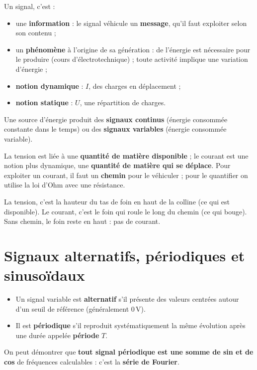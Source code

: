 \begin{defnbox}[title=Signal]
Un signal, c'est :
\begin{itemize}
  \item une \textbf{information} : le signal véhicule un \textbf{message}, qu'il faut
        exploiter selon son contenu ;
  \item un \textbf{phénomène} à l'origine de sa génération : de l'énergie est nécessaire pour
        le produire (cours d'électrotechnique) ; toute activité implique une variation
        d'énergie ;
  \item \textbf{notion dynamique} : $I$, des charges en déplacement ;
  \item \textbf{notion statique} : $U$, une répartition de charges.
\end{itemize}
Une source d'énergie produit des \textbf{signaux continus} (énergie consommée constante dans
le temps) ou des \textbf{signaux variables} (énergie consommée variable).
\end{defnbox}

La tension est liée à une \textbf{quantité de matière disponible} ; le courant est une notion
plus dynamique, une \textbf{quantité de matière qui se déplace}. Pour exploiter un courant, il
faut un \textbf{chemin} pour le véhiculer ; pour le quantifier on utilise la loi d'Ohm avec une
résistance.

\begin{goatbox}
La tension, c'est la hauteur du tas de foin en haut de la colline (ce qui est disponible).
Le courant, c'est le foin qui roule le long du chemin (ce qui bouge). Sans chemin, le foin
reste en haut : pas de courant.
\end{goatbox}

\section{Signaux alternatifs, périodiques et sinusoïdaux}


\begin{defnbox}[title=Alternatif et périodique]
\begin{itemize}
  \item Un signal variable est \textbf{alternatif} s'il présente des valeurs centrées
        autour d'un seuil de référence (généralement 0\,V).
  \item Il est \textbf{périodique} s'il reproduit systématiquement la même évolution après
        une durée appelée \textbf{période} $T$.
\end{itemize}
On peut démontrer que \textbf{tout signal périodique est une somme de sin et de cos} de
fréquences calculables : c'est la \textbf{série de Fourier}.
\end{defnbox}


